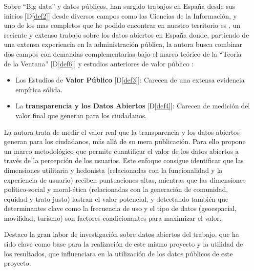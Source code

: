	Sobre ``Big data'' y datos públicos, han surgido trabajos en España desde sus inicios \citep{OperGovernment2011} [D\ref{def2}] desde diversos campos como las Ciencias de la Información, y uno de los mas completos que he podido encontrar en nuestro territorio es \citep{HerreraCapriz2024}, un reciente y extenso trabajo sobre los datos abiertos en España donde, partiendo de una extensa experiencia en la administración pública, la autora busca combinar dos campos con demandas complementarias bajo el marco teórico de la ``Teoría de la Ventana'' [D\ref{def6}] y estudios anteriores de valor público \citep{Meynhardt19032009}:
	\begin{itemize}
		\item Los Estudios de \textbf{Valor Público} [D\ref{def3}]: Carecen de una extensa evidencia empírica sólida.
		\item La \textbf{transparencia y los Datos Abiertos} [D\ref{def4}]: Carecen de medición del valor final que generan para los ciudadanos.
	\end{itemize}
	
	La autora trata de medir el valor real que la transparencia y los datos abiertos generan para los ciudadanos, más allá de su mera publicación. Para ello propone un marco metodológico que permite cuantificar el valor de los datos abiertos a través de la percepción de los usuarios. Este enfoque consigue identificar que las dimensiones utilitaria y hedonista (relacionadas con la funcionalidad y la experiencia de usuario) reciben puntuaciones altas, mientras que las dimensiones político-social y moral-ética (relacionadas con la generación de comunidad, equidad y trato justo) lastran el valor potencial, y detectando también que determinantes clave como la frecuencia de uso y el tipo de datos (geoespacial, movilidad, turismo) son factores condicionantes para maximizar el valor.
	
	Destaco la gran labor de investigación sobre datos abiertos del trabajo, que ha sido clave como base para la realización de este mismo proyecto y la utilidad de los resultados, que influenciara en la utilización de los datos públicos de este proyecto.
	
